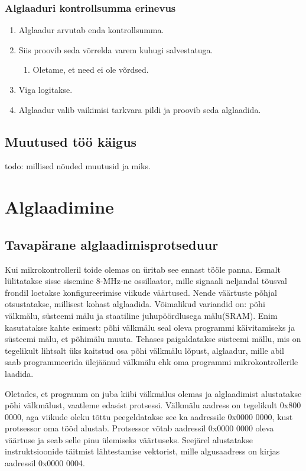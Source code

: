 \documentclass[12pt,a4paper]{article}
\begin{document}
\subsubsection{Alglaaduri kontrollsumma erinevus}
\begin{enumerate}
	\item Alglaadur arvutab enda kontrollsumma.
	\item Siis proovib seda võrrelda varem kuhugi salvestatuga.
		\begin{enumerate}
		\item Oletame, et need ei ole võrdsed.
		\end{enumerate}
	\item Viga logitakse.
	\item Alglaadur valib vaikimisi tarkvara pildi ja proovib seda alglaadida.
\end{enumerate}

\subsection{Muutused töö käigus}
todo: millised nõuded muutusid ja miks.

\section{Alglaadimine}
\label{sec:boot}
\subsection{Tavapärane alglaadimisprotseduur}
Kui mikrokontrolleril toide olemas on üritab see ennast tööle panna.
Esmalt lülitatakse sisse sisemine 8-MHz-ne ossillaator, mille signaali
neljandal tõusval frondil loetakse konfigureerimise viikude väärtused. Nende
väärtuste põhjal otsustatakse, millisest kohast alglaadida. Võimalikud
variandid on: põhi välkmälu, süsteemi mälu ja staatiline juhupöördlusega
mälu(SRAM).  Enim kasutatakse kahte esimest: põhi välkmälu seal oleva programmi
käivitamiseks ja süsteemi mälu, et põhimälu muuta. Tehases paigaldatakse
süsteemi mällu, mis on tegelikult lihtsalt üks kaitstud osa põhi välkmälu
lõpust, alglaadur, mille abil saab programmeerida ülejäänud välkmälu ehk oma
programmi mikrokontrollerile laadida.

Oletades, et programm on juba kiibi välkmälus olemas ja alglaadimist
alustatakse põhi välkmälust, vaatleme edasist protsessi. Välkmälu aadress on
tegelikult 0x800 0000, aga viikude oleku tõttu peegeldatakse see ka aadressile
0x0000 0000, kust protsessor oma tööd alustab.  Protsessor võtab aadressil
0x0000 0000 oleva väärtuse ja seab selle pinu ülemiseks väärtuseks. Seejärel
alustatakse instruktsioonide täitmist lähtestamise vektorist, mille
algusaadress on kirjas aadressil 0x0000 0004. \cite{f1rm}
\end{document}
